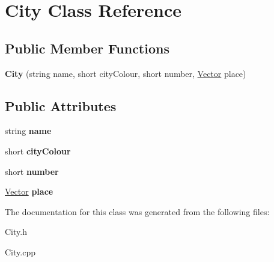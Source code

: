 \hypertarget{class_city}{\section{City Class Reference}
\label{class_city}
}
\subsection*{Public Member Functions}
\begin{DoxyCompactItemize}
\item 
\hypertarget{class_city_a9d0f70f96ab8c2e130639170d129b245}{{\bfseries City} (string name, short city\-Colour, short number, \hyperlink{class_vector}{Vector} place)}\label{class_city_a9d0f70f96ab8c2e130639170d129b245}

\end{DoxyCompactItemize}
\subsection*{Public Attributes}
\begin{DoxyCompactItemize}
\item 
\hypertarget{class_city_a38b5e8b9bd4e263434eae0344913d341}{string {\bfseries name}}\label{class_city_a38b5e8b9bd4e263434eae0344913d341}

\item 
\hypertarget{class_city_afe0317c4414810339140c1d94c25ba25}{short {\bfseries city\-Colour}}\label{class_city_afe0317c4414810339140c1d94c25ba25}

\item 
\hypertarget{class_city_a0fecf97dc1cbd61bb1bd27325decad52}{short {\bfseries number}}\label{class_city_a0fecf97dc1cbd61bb1bd27325decad52}

\item 
\hypertarget{class_city_a5198a6b2528d631949b17af95895a405}{\hyperlink{class_vector}{Vector} {\bfseries place}}\label{class_city_a5198a6b2528d631949b17af95895a405}

\end{DoxyCompactItemize}


The documentation for this class was generated from the following files\-:\begin{DoxyCompactItemize}
\item 
City.\-h\item 
City.\-cpp\end{DoxyCompactItemize}
